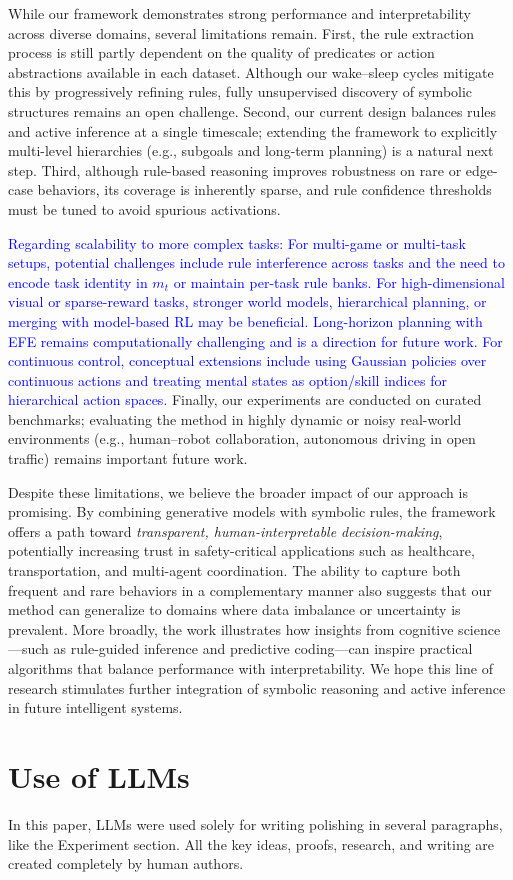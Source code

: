 \documentclass{article} %
\newcommand{\revise}[1]{\textcolor{blue}{#1}}
\begin{document}
While our framework demonstrates strong performance and interpretability across
diverse domains, several limitations remain. First, the rule extraction process
is still partly dependent on the quality of predicates or action abstractions
available in each dataset. Although our wake--sleep cycles mitigate this by
progressively refining rules, fully unsupervised discovery of symbolic structures
remains an open challenge. Second, our current design balances rules and active
inference at a single timescale; extending the framework to explicitly
multi-level hierarchies (e.g., subgoals and long-term planning) is a natural
next step. Third, although rule-based reasoning improves robustness on rare or
edge-case behaviors, its coverage is inherently sparse, and rule confidence
thresholds must be tuned to avoid spurious activations. 

\revise{Regarding scalability to more complex tasks: For multi-game or multi-task setups, potential challenges include rule interference across tasks and the need to encode task identity in $m_t$ or maintain per-task rule banks. For high-dimensional visual or sparse-reward tasks, stronger world models, hierarchical planning, or merging with model-based RL may be beneficial. Long-horizon planning with EFE remains computationally challenging and is a direction for future work. For continuous control, conceptual extensions include using Gaussian policies over continuous actions and treating mental states as option/skill indices for hierarchical action spaces.} Finally, our experiments
are conducted on curated benchmarks; evaluating the method in highly dynamic or
noisy real-world environments (e.g., human–robot collaboration, autonomous
driving in open traffic) remains important future work.

Despite these limitations, we believe the broader impact of our approach is
promising. By combining generative models with symbolic rules, the framework
offers a path toward \emph{transparent, human-interpretable decision-making},
potentially increasing trust in safety-critical applications such as healthcare,
transportation, and multi-agent coordination. The ability to capture both
frequent and rare behaviors in a complementary manner also suggests that our
method can generalize to domains where data imbalance or uncertainty is
prevalent. More broadly, the work illustrates how insights from cognitive
science---such as rule-guided inference and predictive coding---can inspire
practical algorithms that balance performance with interpretability. We hope
this line of research stimulates further integration of symbolic reasoning and
active inference in future intelligent systems.



\section{Use of LLMs}
\label{appendix_sec:use_of_llms}

In this paper, LLMs were used solely for writing polishing in several paragraphs, like the Experiment section. All the key ideas, proofs, research, and writing are created completely by human authors.
\end{document}

